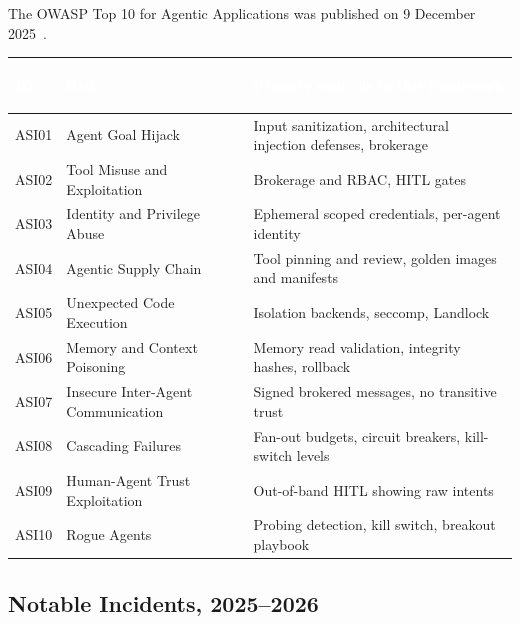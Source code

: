 \documentclass[11pt,letterpaper]{article}
\newcommand{\hrow}{\rowcolor{slategraphite}}
\newcommand{\hdr}[1]{\textcolor{white}{\bfseries\strut #1}}
\begin{document}
The OWASP Top 10 for Agentic Applications was published on 9 December 2025~\cite{owaspasi}.

\begin{longtable}{L{1.4cm} L{5.2cm} L{9.4cm}}
\hrow \hdr{ID} & \hdr{Risk} & \hdr{Primary controls in this framework} \\
\endhead
ASI01 & Agent Goal Hijack & Input sanitization, architectural injection defenses, brokerage \\
ASI02 & Tool Misuse and Exploitation & Brokerage and RBAC, HITL gates \\
ASI03 & Identity and Privilege Abuse & Ephemeral scoped credentials, per-agent identity \\
ASI04 & Agentic Supply Chain & Tool pinning and review, golden images and manifests \\
ASI05 & Unexpected Code Execution & Isolation backends, seccomp, Landlock \\
ASI06 & Memory and Context Poisoning & Memory read validation, integrity hashes, rollback \\
ASI07 & Insecure Inter-Agent Communication & Signed brokered messages, no transitive trust \\
ASI08 & Cascading Failures & Fan-out budgets, circuit breakers, kill-switch levels \\
ASI09 & Human-Agent Trust Exploitation & Out-of-band HITL showing raw intents \\
ASI10 & Rogue Agents & Probing detection, kill switch, breakout playbook \\*
\bottomrule
\end{longtable}

\subsection{Notable Incidents, 2025--2026}
\label{sec:incidents}
\end{document}
